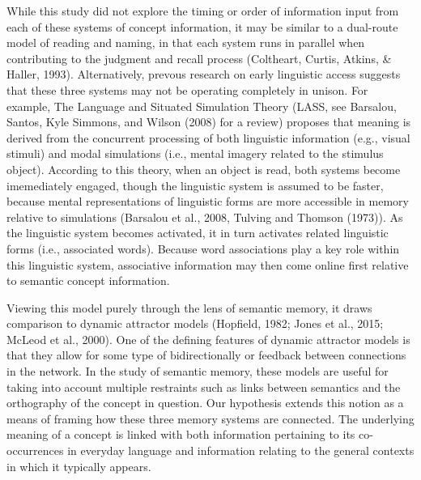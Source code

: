 \documentclass[english,,man]{apa6}
\begin{document}
While this study did not explore the timing or order of information
input from each of these systems of concept information, it may be
similar to a dual-route model of reading and naming, in that each system
runs in parallel when contributing to the judgment and recall process
(Coltheart, Curtis, Atkins, \& Haller, 1993). Alternatively, prevous
research on early linguistic access suggests that these three systems
may not be operating completely in unison. For example, The Language and
Situated Simulation Theory (LASS, see Barsalou, Santos, Kyle Simmons,
and Wilson (2008) for a review) proposes that meaning is derived from
the concurrent processing of both linguistic information (e.g., visual
stimuli) and modal simulations (i.e., mental imagery related to the
stimulus object). According to this theory, when an object is read, both
systems become imemediately engaged, though the linguistic system is
assumed to be faster, because mental representations of linguistic forms
are more accessible in memory relative to simulations (Barsalou et al.,
2008, Tulving and Thomson (1973)). As the linguistic system becomes
activated, it in turn activates related linguistic forms (i.e.,
associated words). Because word associations play a key role within this
linguistic system, associative information may then come online first
relative to semantic concept information.

Viewing this model purely through the lens of semantic memory, it draws
comparison to dynamic attractor models (Hopfield, 1982; Jones et al.,
2015; McLeod et al., 2000). One of the defining features of dynamic
attractor models is that they allow for some type of bidirectionally or
feedback between connections in the network. In the study of semantic
memory, these models are useful for taking into account multiple
restraints such as links between semantics and the orthography of the
concept in question. Our hypothesis extends this notion as a means of
framing how these three memory systems are connected. The underlying
meaning of a concept is linked with both information pertaining to its
co-occurrences in everyday language and information relating to the
general contexts in which it typically appears.
\end{document}
